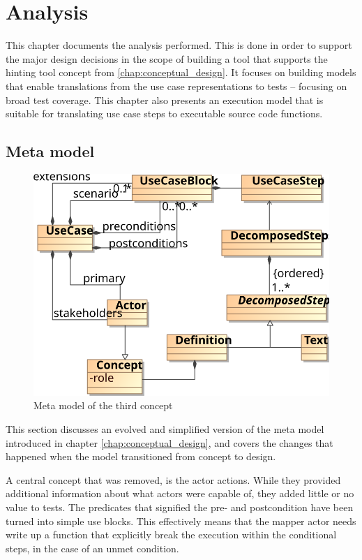 \chapter{Analysis}
\label{ch:design}
This chapter documents the analysis performed. This is done in order to support the major design decisions in the scope of building a tool that supports the hinting tool concept from \ref{chap:conceptual_design}. It focuses on building models that enable translations from the use case representations to tests -- focusing on broad test coverage. This chapter also presents an execution model that is suitable for translating use case steps to executable source code functions.

\section{Meta model}
\begin{figure}[!htbp]
  \centering
  \includegraphics[scale=0.9]{img/3rd_iteration_meta_model}
  \caption{Meta model of the third concept}
  \label{fig:3rd_iteration_meta_model}
\end{figure}
\noindent This section discusses an evolved and simplified version of the meta model introduced in chapter \ref{chap:conceptual_design}, and covers the changes that happened when the model transitioned from concept to design.\medskip

\noindent A central concept that was removed, is the actor actions. While they provided additional information about what actors were capable of, they added little or no value to tests. The predicates that signified the pre- and postcondition have been turned into simple use blocks. This effectively means that the mapper actor needs write up a function that explicitly break the execution within the conditional steps, in the case of an unmet condition.\medskip


